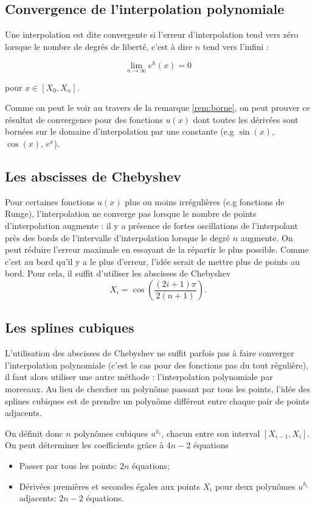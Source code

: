 \subsection{Convergence de l'interpolation polynomiale}
\begin{mydef}
	Une interpolation est dite convergente si l'erreur d'interpolation tend vers
	zéro lorsque le nombre de degrés de liberté, c'est à dire $n$ tend vers l'infini :
	
	$$\lim_{n \to \infty} e^h(x) = 0$$
	
	pour $x \in [X_0, X_n]$.
\end{mydef}

Comme on peut le voir au travers de la remarque \ref{rem:borne}, on peut prouver 
ce résultat de convergence pour des fonctions $u(x)$ dont toutes les dérivées sont
bornées sur le domaine d'interpolation par une constante (e.g $\sin(x)$, $\cos(x)$, $e^x$).

\subsection{Les abscisses de Chebyshev}
Pour certaines fonctions $u(x)$ plus ou moins irrégulières (e.g fonctions de Runge),
l'interpolation ne converge pas lorsque le nombre de points d'interpolation
augmente : il y a présence de fortes oscillations de l'interpolant près des
bords de l'intervalle d'interpolation lorsque le degré $n$ augmente.
On peut réduire l'erreur maximale en essayant de la répartir le plus possible.
Comme c'est au bord qu'il y a le plus d'erreur, l'idée serait de mettre
plus de points au bord.
Pour cela, il suffit d'utiliser les abscisses de Chebyshev
\[ X_i = \cos\left(\frac{(2i+1)\pi}{2(n+1)}\right). \]

\subsection{Les splines cubiques}
L'utilisation des abscisses de Chebyshev ne suffit parfois pas à faire converger
l'interpolation polynomiale (c'est le cas pour des fonctions pas du tout régulière),
il faut alors utiliser une autre méthode : l'interpolation polynomiale par morceaux.
Au lieu de chercher un polynôme passant par tous les points, l'idée des
splines cubiques est de prendre un polynôme différent entre chaque pair
de points adjacents.

On définit donc $n$ polynômes cubiques $u^{h_i}$, chacun entre son
interval $[X_{i-1}, X_i]$.
On peut déterminer les coefficients grâce à $4n-2$ équations
\begin{itemize}
  \item Passer par tous les points: $2n$ équations;
  \item Dérivées premières et secondes égales aux points $X_i$
    pour deux polynômes $u^{h_i}$ adjacents: $2n-2$ équations.
\end{itemize}


